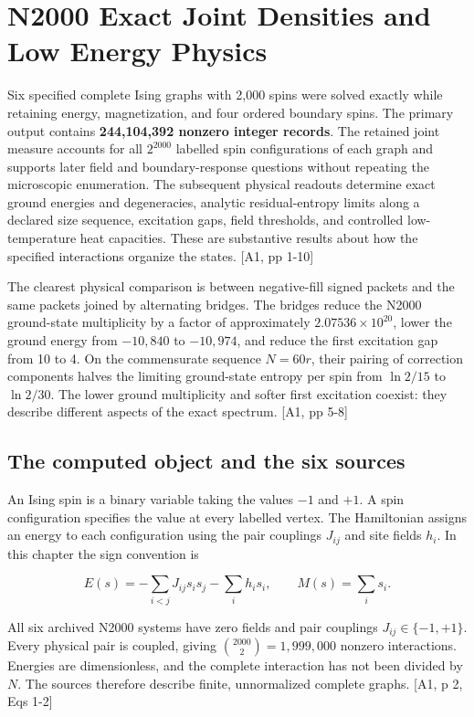 \chapter{N2000 Exact Joint Densities and Low Energy Physics}\label{n2000-exact-joint-densities-and-low-energy-physics}

Six specified complete Ising graphs with 2,000 spins were solved exactly while retaining energy, magnetization, and four ordered boundary spins. The primary output contains \textbf{244,104,392 nonzero integer records}. The retained joint measure accounts for all \(2^{2000}\) labelled spin configurations of each graph and supports later field and boundary-response questions without repeating the microscopic enumeration. The subsequent physical readouts determine exact ground energies and degeneracies, analytic residual-entropy limits along a declared size sequence, excitation gaps, field thresholds, and controlled low-temperature heat capacities. These are substantive results about how the specified interactions organize the states. {[}A1, pp 1-10{]}

The clearest physical comparison is between negative-fill signed packets and the same packets joined by alternating bridges. The bridges reduce the N2000 ground-state multiplicity by a factor of approximately \(2.07536\times10^{20}\), lower the ground energy from \(-10,840\) to \(-10,974\), and reduce the first excitation gap from 10 to 4. On the commensurate sequence \(N=60r\), their pairing of correction components halves the limiting ground-state entropy per spin from \(\ln 2/15\) to \(\ln 2/30\). The lower ground multiplicity and softer first excitation coexist: they describe different aspects of the exact spectrum. {[}A1, pp 5-8{]}

\section{The computed object and the six sources}\label{the-computed-object-and-the-six-sources}

An Ising spin is a binary variable taking the values \(-1\) and \(+1\). A spin configuration specifies the value at every labelled vertex. The Hamiltonian assigns an energy to each configuration using the pair couplings \(J_{ij}\) and site fields \(h_i\). In this chapter the sign convention is

\[E(s)=-\sum_{i<j}J_{ij}s_i s_j-\sum_i h_i s_i,\qquad M(s)=\sum_i s_i.\]

All six archived N2000 systems have zero fields and pair couplings \(J_{ij}\in\{-1,+1\}\). Every physical pair is coupled, giving \(\binom{2000}{2}=1,999,000\) nonzero interactions. Energies are dimensionless, and the complete interaction has not been divided by \(N\). The sources therefore describe finite, unnormalized complete graphs. {[}A1, p 2, Eqs 1-2{]}

